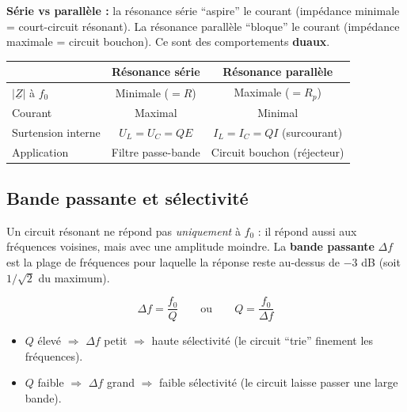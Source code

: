\documentclass[12pt,a4paper,twoside]{book}
\begin{document}
\begin{intuition}
\textbf{Série vs parallèle :} la résonance série ``aspire'' le courant (impédance minimale = court-circuit résonant). La résonance parallèle ``bloque'' le courant (impédance maximale = circuit bouchon). Ce sont des comportements \textbf{duaux}.

\begin{center}
\begin{tabular}{lcc}
\toprule
 & \textbf{Résonance série} & \textbf{Résonance parallèle} \\
\midrule
$|\underline{Z}|$ à $f_0$ & Minimale ($= R$) & Maximale ($= R_p$) \\
Courant & Maximal & Minimal \\
Surtension interne & $U_L = U_C = QE$ & $I_L = I_C = QI$ (surcourant) \\
Application & Filtre passe-bande & Circuit bouchon (réjecteur) \\
\bottomrule
\end{tabular}
\end{center}
\end{intuition}

\subsection{Bande passante et sélectivité}

Un circuit résonant ne répond pas \textit{uniquement} à $f_0$ : il répond aussi aux fréquences voisines, mais avec une amplitude moindre. La \textbf{bande passante} $\Delta f$ est la plage de fréquences pour laquelle la réponse reste au-dessus de $-3$ dB (soit $1/\sqrt{2}$ du maximum).

\begin{formule}
\[
\boxed{\Delta f = \frac{f_0}{Q}} \qquad \text{ou} \qquad \boxed{Q = \frac{f_0}{\Delta f}}
\]
\begin{itemize}[nosep]
\item $Q$ élevé $\Rightarrow$ $\Delta f$ petit $\Rightarrow$ haute sélectivité (le circuit ``trie'' finement les fréquences).
\item $Q$ faible $\Rightarrow$ $\Delta f$ grand $\Rightarrow$ faible sélectivité (le circuit laisse passer une large bande).
\end{itemize}
\end{formule}
\end{document}
